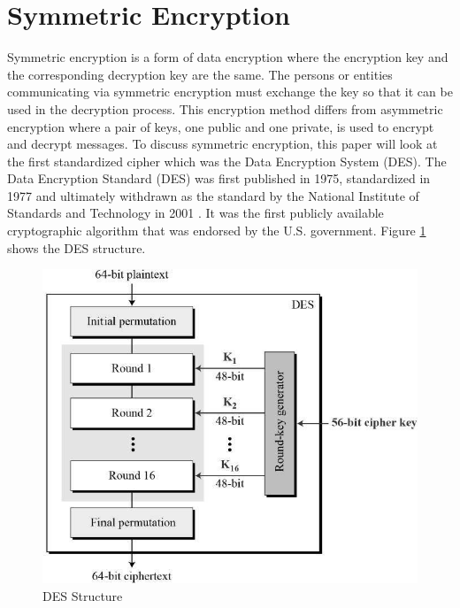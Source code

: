 \documentclass[journal]{IEEEtran}
\begin{document}
\section{\textbf{Symmetric Encryption}}
Symmetric encryption is a form of data encryption where the encryption key and the corresponding decryption key are the same. The persons or entities communicating via symmetric encryption must exchange the key so that it can be used in the decryption process. This encryption method differs from asymmetric encryption where a pair of keys, one public and one private, is used to encrypt and decrypt messages. To discuss symmetric encryption, this paper will look at the first standardized cipher which was the Data Encryption System (DES). 
\newline \newline
The Data Encryption Standard (DES) was first published in 1975, standardized in 1977 and ultimately withdrawn as the standard by the National Institute of Standards and Technology in 2001 \cite{DES}. It was the first publicly available cryptographic algorithm that was endorsed by the U.S. government. Figure \ref{fig:des} shows the DES structure.
\newline
\newline
\begin{figure}[!h]
    \centering
    \includegraphics[scale=.3]{des_structure}
    \caption{DES Structure}
    \label{fig:des}
\end{figure}
\end{document}
